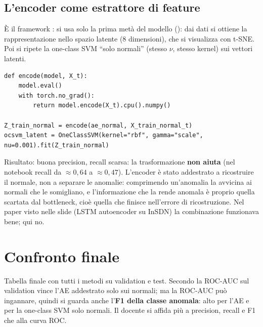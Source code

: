 \subsection{L'encoder come estrattore di feature}
È il framework : si usa solo la prima metà del modello (): dai dati si ottiene la
rappresentazione nello spazio latente (8 dimensioni), che si visualizza con t-SNE. Poi si ripete la one-class SVM ``solo normali'' (stesso
$\nu$, stesso kernel) sui vettori latenti.
\begin{lstlisting}
def encode(model, X_t):
    model.eval()
    with torch.no_grad():
        return model.encode(X_t).cpu().numpy()

Z_train_normal = encode(ae_normal, X_train_normal_t)
ocsvm_latent = OneClassSVM(kernel="rbf", gamma="scale", nu=0.001).fit(Z_train_normal)
\end{lstlisting}
Risultato: buona precision, recall scarsa: la trasformazione \textbf{non aiuta} (nel notebook recall da $\approx 0{,}64$ a $\approx 0{,}47$).
L'encoder è stato addestrato a ricostruire il normale, non a separare le anomalie: comprimendo un'anomalia la avvicina ai normali che le
somigliano, e l'informazione che la rende anomala è proprio quella scartata dal bottleneck, cioè quella che finisce nell'errore di
ricostruzione. Nel paper visto nelle slide (LSTM autoencoder su InSDN) la combinazione funzionava bene; qui no.

\section{Confronto finale}
Tabella finale con tutti i metodi su validation e test. Secondo la ROC-AUC sul validation vince l'AE addestrato solo sui normali; ma la
ROC-AUC può ingannare, quindi si guarda anche l'\textbf{F1 della classe anomala}: alto per l'AE e per la one-class SVM solo normali. Il
docente si affida più a precision, recall e F1 che alla curva ROC.

